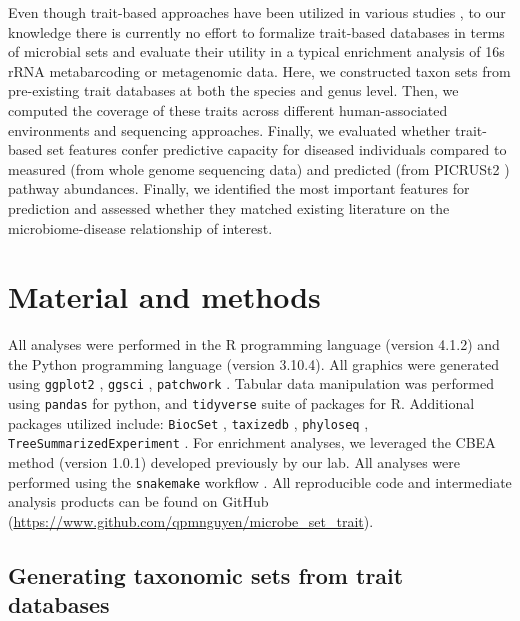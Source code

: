 Even though trait-based approaches have been utilized in various studies \cite{weissman2021exploring, bewick2019traitbased, guittar2019traitbased, krause2014traitbased}, to our knowledge there is currently no effort to formalize trait-based databases in terms of microbial sets and evaluate their utility in a typical enrichment analysis of 16s rRNA metabarcoding or metagenomic data. Here, we constructed taxon sets from pre-existing trait databases at both the species and genus level. Then, we computed the coverage of these traits across different human-associated environments and sequencing approaches. Finally, we evaluated whether trait-based set features confer predictive capacity for diseased individuals compared to measured (from whole genome sequencing data) and predicted (from PICRUSt2 \cite{douglas2020picrust2}) pathway abundances. Finally, we identified the most important features for prediction and assessed whether they matched existing literature on the microbiome-disease relationship of interest.  


\section{Material and methods} \label{ch4_methods}

All analyses were performed in the R programming language (version 4.1.2) \cite{rcoreteam2021language} and the Python programming language (version 3.10.4). All graphics were generated using \texttt{ggplot2} \cite{wickham2016ggplot2}, \texttt{ggsci} \cite{xiao2018ggsci}, \texttt{patchwork} \cite{pedersen2020patchwork}. Tabular data manipulation was performed using \texttt{pandas} for python, and \texttt{tidyverse} \cite{wickham2011splitapplycombine} suite of packages for R. Additional packages utilized include: \texttt{BiocSet} \cite{morrell2021biocset}, \texttt{taxizedb} \cite{chamberlain2021taxizedb}, \texttt{phyloseq} \cite{mcmurdie2013phyloseq}, \texttt{TreeSummarizedExperiment} \cite{huang2021treesummarizedexperiment}. For enrichment analyses, we leveraged the CBEA \cite{nguyen2021cbea} method (version 1.0.1) developed previously by our lab. All analyses were performed using the \texttt{snakemake} workflow \cite{molder2021sustainable}. All reproducible code and intermediate analysis products can be found on GitHub (\url{https://www.github.com/qpmnguyen/microbe_set_trait}).  

\subsection{Generating taxonomic sets from trait databases}  


